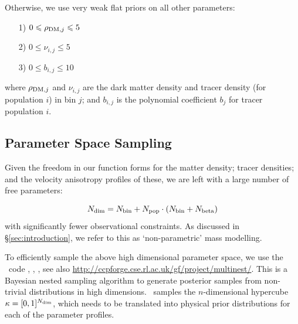 Otherwise, we use very weak flat priors on all other parameters:

\begin{enumerate}
    \item[1)] $0\leq \rho_{{\rm DM},j} \leq 5$
    \item[2)] $0\leq \nu_{i,j}  \leq 5$
    \item[3)] $0\leq b_{i,j} \leq 10$
\end{enumerate}
where $\rho_{{\rm DM},j}$ and $\nu_{i,j}$ are the dark matter density and tracer
density (for population $i$) in bin $j$; and $b_{i,j}$ is the polynomial
coefficient $b_j$ for tracer population $i$.

%
%
%

\subsection{Parameter Space Sampling}
Given the freedom in our function forms for the matter density; tracer
densities; and the velocity anisotropy profiles of these, we are left with a
large number of free parameters:

\begin{equation}
    N_{\rm dim} = N_{\rm bin} + N_{\rm pop}\cdot(N_{\rm bin}+N_{\rm beta})
\end{equation}
with significantly fewer observational constraints. As discussed in
\S\ref{sec:introduction}, we refer to this as `non-parametric' mass modelling.

To efficiently sample the above high dimensional parameter space, we use the
\MultiNest\ code \citep{FerozHobson2008}, \citep{Feroz+2009},
\citep{Feroz+2013}, see also
\url{http://ccpforge.cse.rl.ac.uk/gf/project/multinest/}. This is a Bayesian
nested sampling algorithm to generate posterior samples from non-trivial
distributions in high dimensions. \MultiNest\ samples the $n$-dimensional
hypercube $\kappa=[0,1]^{N_{\rm dim}}$, which needs to be translated into
physical prior distributions for each of the parameter profiles.

